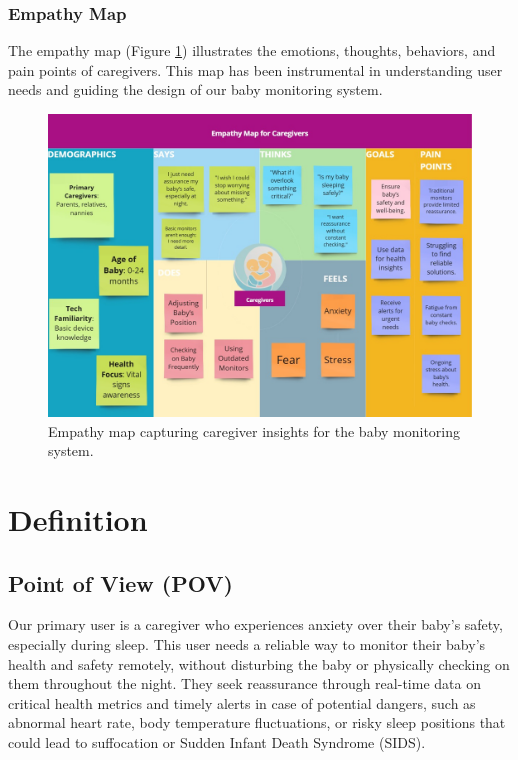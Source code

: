 \documentclass[12pt,a4paper]{report}
\begin{document}
\subsection{Empathy Map}
The empathy map (Figure \ref{fig:empathy}) illustrates the emotions, thoughts, behaviors, and pain points of caregivers. This map has been instrumental in understanding user needs and guiding the design of our baby monitoring system.

\begin{figure}[H]
  \centering
  \includegraphics[scale=0.39]{./pic/empathy.jpg}
  \caption{Empathy map capturing caregiver insights for the baby monitoring system.}
  \label{fig:empathy}
\end{figure}


\chapter{Definition}
\section{Point of View (POV)}
Our primary user is a caregiver who experiences anxiety over their baby's safety, especially during sleep. This user needs a reliable way to monitor their baby’s health and safety remotely, without disturbing the baby or physically checking on them throughout the night. They seek reassurance through real-time data on critical health metrics and timely alerts in case of potential dangers, such as abnormal heart rate, body temperature fluctuations, or risky sleep positions that could lead to suffocation or Sudden Infant Death Syndrome (SIDS).
\end{document}
